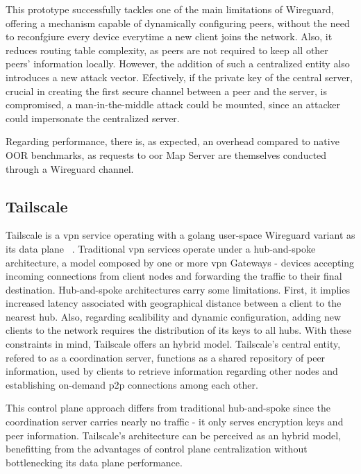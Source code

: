 \documentclass[11pt,twoside,a4paper]{report}
\begin{document}
This prototype successfully tackles one of the main limitations of Wireguard, offering a mechanism capable of dynamically configuring peers, without the need to reconfgiure every device everytime a new client joins the network. Also, it reduces routing table complexity, as peers are not required to keep all other peers' information locally. However, the addition of such a centralized entity also introduces a new attack vector. Efectively, if the private key of the central server, crucial in creating the first secure channel between a peer and the server, is compromised, a man-in-the-middle attack could be mounted, since an attacker could impersonate the centralized server.

Regarding performance, there is, as expected, an overhead compared to native OOR benchmarks, as requests to \acrshort{oor} Map Server are themselves conducted through a Wireguard channel.

\subsection{Tailscale}

Tailscale is a \acrshort{vpn} service operating with a golang user-space Wireguard variant as its data plane ~\cite{tailscale2020online}. Traditional \acrshort{vpn} services operate under a hub-and-spoke architecture, a model composed by one or more \acrshort{vpn} Gateways - devices accepting incoming connections from client nodes and forwarding the traffic to their final destination. Hub-and-spoke architectures carry some limitations. First, it implies increased latency associated with geographical distance between a client to the nearest hub. Also, regarding scalibility and dynamic configuration, adding new clients to the network requires the distribution of its keys to all hubs. With these constraints in mind, Tailscale offers an hybrid model. Tailscale's central entity, refered to as a coordination server, functions as a shared repository of peer information, used by clients to retrieve information regarding other nodes and establishing on-demand \acrshort{p2p} connections among each other.

This control plane approach differs from traditional hub-and-spoke since the coordination server carries nearly no traffic - it only serves encryption keys and peer information. Tailscale's architecture can be perceived as an hybrid model, benefitting from the advantages of control plane centralization without bottlenecking its data plane performance.
\end{document}
